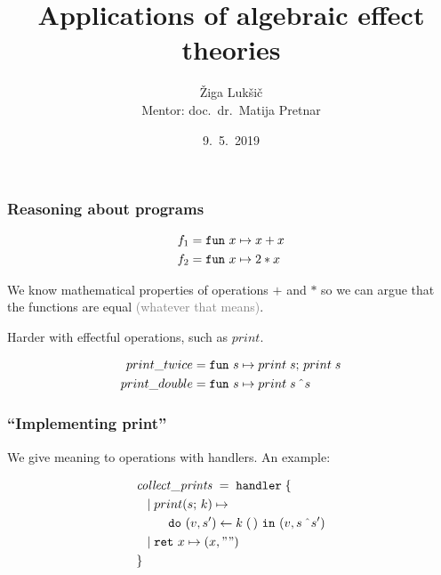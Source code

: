 \documentclass[usenames,dvipsnames]{beamer}
\title[Applications of algebraic effect theories]{\LARGE Applications of algebraic effect theories}
\author[Žiga Lukšič]{Žiga Lukšič \\ Mentor: doc.\ dr.\ Matija Pretnar}
\date{9.\ 5.\ 2019}
\begin{document}
\begin{frame}
  \titlepage
\end{frame}
\begin{frame}
	\frametitle{Reasoning about programs}
	
  \begin{align*}
		f_1 =& \;\mathtt{fun}~{x} \mapsto{x + x}\\
		f_2 =& \;\mathtt{fun}~{x} \mapsto{2*x}
	\end{align*}

	We know mathematical properties of operations $+$ and $*$ so we can argue that the functions are equal \textcolor{gray}{(whatever that means)}.
	
	\vspace{5mm}

	Harder with effectful operations, such as $print$.

	\begin{align*}
		print\_twice =& \;\mathtt{fun}~{s} \mapsto{{print}\;{s};\,{print}\;{s}}\\
		print\_double =& \;\mathtt{fun}~{s} \mapsto{{print}\;{s \, \;\hat{}\;s}}
	\end{align*}


\end{frame}
\begin{frame}
	\frametitle{``Implementing print''}
	
	We give meaning to operations with handlers. An example:

	\begin{align*}
		&\mathit{collect\_prints} \; = \; \keyhandler \; \{ \\
		&\tab | \; \operation[print]{s}{k} \mapsto \\
		&\tab \tab \tab \betterdobind{(v, s')}{\apply{k}{\unit}}(v, s\,\concat s')\\
		&\tab | \; \return{x} \mapsto (x, "") \\
		&\}
	\end{align*}

\end{frame}
\end{document}
